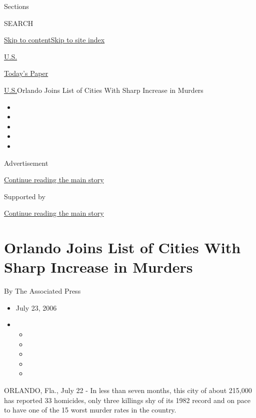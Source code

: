 Sections

SEARCH

\protect\hyperlink{site-content}{Skip to
content}\protect\hyperlink{site-index}{Skip to site index}

\href{https://www.nytimes3xbfgragh.onion/section/us}{U.S.}

\href{https://myaccount.nytimes3xbfgragh.onion/auth/login?response_type=cookie\&client_id=vi}{}

\href{https://www.nytimes3xbfgragh.onion/section/todayspaper}{Today's
Paper}

\href{/section/us}{U.S.}\textbar{}Orlando Joins List of Cities With
Sharp Increase in Murders

\begin{itemize}
\item
\item
\item
\item
\item
\end{itemize}

Advertisement

\protect\hyperlink{after-top}{Continue reading the main story}

Supported by

\protect\hyperlink{after-sponsor}{Continue reading the main story}

\hypertarget{orlando-joins-list-of-cities-with-sharp-increase-in-murders}{%
\section{Orlando Joins List of Cities With Sharp Increase in
Murders}\label{orlando-joins-list-of-cities-with-sharp-increase-in-murders}}

By The Associated Press

\begin{itemize}
\item
  July 23, 2006
\item
  \begin{itemize}
  \item
  \item
  \item
  \item
  \item
  \end{itemize}
\end{itemize}

ORLANDO, Fla., July 22 - In less than seven months, this city of about
215,000 has reported 33 homicides, only three killings shy of its 1982
record and on pace to have one of the 15 worst murder rates in the
country.

